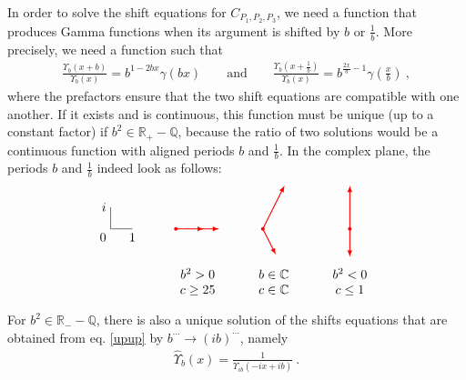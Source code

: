 \documentclass[12pt, a4paper]{article}
\theoremstyle{break}
\begin{document}
In order to solve the shift equations for $C_{P_1,P_2,P_3}$, we need a function that produces Gamma functions when its argument is shifted by $b$ or $\frac{1}{b}$. More precisely, we need a function such that 
\begin{align}
  \frac{\Upsilon_b(x+b)}{\Upsilon_b(x)} = b^{1-2bx} \gamma(bx)\qquad \text{and} \qquad \frac{\Upsilon_b(x+\frac{1}{b})}{\Upsilon_b(x)} = b^{\frac{2x}{b}-1} \gamma(\tfrac{x}{b})\ ,
\label{upup}
\end{align}
where the prefactors ensure that the two shift equations are compatible with one another. If it exists and is continuous, this function must be unique (up to a constant factor) if $b^2\in \mathbb{R}_+-\mathbb{Q}$, because the ratio of two solutions would be a continuous function with aligned periods $b$ and $\frac{1}{b}$. In the complex plane, the periods $b$ and $\frac{1}{b}$ indeed look as follows:
\begin{equation}
 \begin{tikzpicture}[baseline=(current  bounding  box.center), scale = .6]
\draw (0, 2) node[left]{$i$} -- (0, 1) node[below left] {$0$} -- (1, 1) node[below] {$1$};
\draw [red, thick, latex-latex] (11,3) -- (11,1) node[fill, circle, minimum size = 1mm, inner sep = 0]{} -- (11,-.3);
\draw [red, thick, latex-latex] (8,3) -- (7,1) node[fill, circle, minimum size = 1mm, inner sep = 0]{}-- (7.6,-.2);
\draw [red, thick, latex-latex] (5,1) -- (3,1) node[fill, circle, minimum size = 1mm, inner sep = 0]{} -- (4.3,1) ;
\node at (4, -1.5){$\begin{array}{c} b^2>0 \\ c\geq 25 \end{array}$};
\node at (7.5, -1.5){$\begin{array}{c} b\in \mathbb{C} \\ c\in\mathbb{C} \end{array}$};
\node at (11, -1.5){$\begin{array}{c} b^2<0 \\ c\leq 1 \end{array}$};
 \end{tikzpicture}
\end{equation}
For $b^2\in \mathbb{R}_--\mathbb{Q}$, there is also a unique solution of the shifts equations that are obtained from eq. \eqref{upup} by $b^{\cdots} \to (ib)^{\cdots}$, namely 
\begin{align}
 \hat{\Upsilon}_b(x) = \frac{1}{\Upsilon_{ib}(-ix+ib)}\ .
\end{align}
\end{document}
